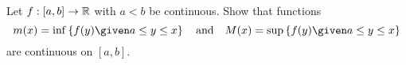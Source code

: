 \begin{problem}
  Let $f : [a, b] \to \mathbb{R}$ with $a < b$ be continuous.
  Show that functions
  \[
    m(x) = \inf \set{ f(y) \given a \leq y \leq x } \quad \text{and} \quad
    M(x) = \sup \set{ f(y) \given a \leq y \leq x }
  \]
  are continuous on $[a, b]$.
\end{problem}

\begin{answer}

\end{answer}
